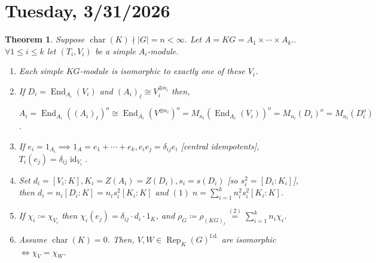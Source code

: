 \documentclass{article}
\theoremstyle{definition}
\theoremstyle{plain}
\newtheorem{theorem}{Theorem}[section]
\theoremstyle{remark}
\begin{document}
    \section*{Tuesday, 3/31/2026}
    
    \begin{theorem}
        Suppose \(\operatorname{char}(K) \nmid \vert G \vert = n < \infty\). Let \(A = KG = A_1 \times \cdots \times A_k.\). \(\forall 1 \leq i \leq k\) let \((T_i , V_i)\) be a simple \(A_i\)-module.

        \begin{enumerate}[label=\roman*)]
            \item Each simple \(KG\)-module is isomorphic to exactly one of these \(V_i\). 
            \item If \(D_i = \operatorname{End}_{A_i}(V_i)\) and \((A_i)_\ell \cong V_i^{\oplus n_i}\) then,
            
            \(A_i = \operatorname{End}_{A_i}((A_i)_\ell)^o \cong \operatorname{End}_{A_i}(V^{\oplus n_i})^o = M_{n_i}(\operatorname{End}_{A_i}(V_i))^o = M_{n_i}(D_i)^o = M_{n_i}(D_i^o)\).

            \item If \(e_i = 1_{A_i} \implies 1_A = e_1 + \cdots + e_k , e_i e_j = \delta_{ij} e_i\) [central idempotents], \(T_i(e_j) = \delta_{ij} \operatorname{id}_{V_i}\).
            \item Set \(d_i = [V_i : K] , K_i = Z(A_i) = Z(D_i), s_i = s(D_i)\) [so \(s_i^2 = [D_i : K_i]\)], then \(d_i = n_i [D_i : K] = n_i s_i^2 [K_i : K]\) and \(\boxed{(1)\; n = \sum_{i=1}^k n_i^2 s_i^2 [K_i : K]}\).
            \item If \(\chi_i \coloneqq \chi_{V_i}\) then \(\chi_i(e_j) = \delta_{ij} \cdot d_i \cdot 1_K\), and \(\boxed{\rho_G \coloneqq \rho_{(KG)_\ell} \overset{(2)}{=} \sum_{i=1}^k n_i \chi_i}\).
            \item Assume \(\operatorname{char}(K) = 0\). Then, \(V,W \in \operatorname{Rep}_{K}(G)^{\text{f.d.}}\) are isomorphic \(\iff \chi_V = \chi_W\). 
        \end{enumerate} 
    \end{theorem}    
\end{document}
